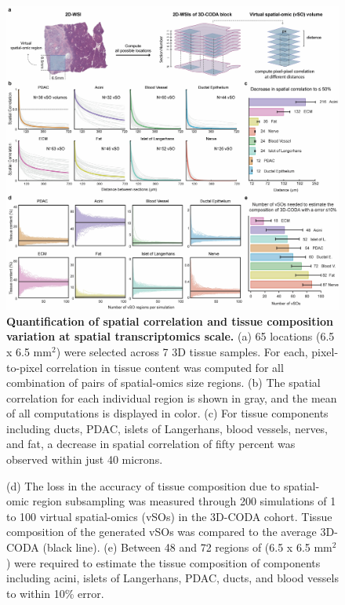 \begin{refsection}
    \begin{figure}[h!]
        \begin{center}
            \includegraphics[width=\textwidth,clip,page=1] {figures/chapter2/PDAC_Fig_S2.jpg}
            \caption{\textbf{Quantification of spatial correlation and tissue composition variation at spatial transcriptomics scale.} (a) 65 locations (6.5 x 6.5 mm$^2$) were selected across 7 3D tissue samples. For each, pixel-to-pixel correlation in tissue content was computed for all combination of pairs of spatial-omics size regions. (b) The spatial correlation for each individual region is shown in gray, and the mean of all computations is displayed in color. (c) For tissue components including ducts, PDAC, islets of Langerhans, blood vessels, nerves, and fat, a decrease in spatial correlation of fifty percent was observed within just 40 microns. }
            \label{chapter2_figS2}
        \end{center}
    \end{figure}
    \begin{figure}[h!]
        \ContinuedFloat
        \captionsetup{font=small}
        \caption[]{(d) The loss in the accuracy of tissue composition due to spatial-omic region subsampling was measured through 200 simulations of 1 to 100 virtual spatial-omics (vSOs) in the 3D-CODA cohort. Tissue composition of the generated vSOs was compared to the average 3D-CODA (black line). (e) Between 48 and 72 regions of (6.5 x 6.5 mm$^2$) were required to estimate the tissue composition of components including acini, islets of Langerhans, PDAC, ducts, and blood vessels to within 10\% error.}
    \end{figure}
    

\end{refsection}
